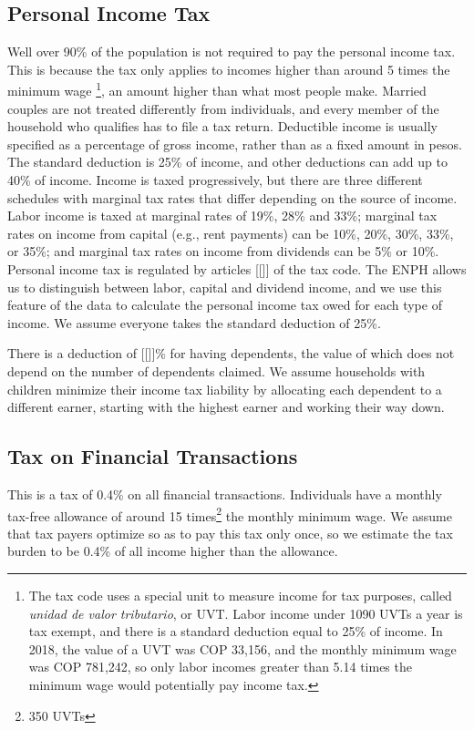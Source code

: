 \documentclass[12pt]{article}
\begin{document}
\begin{appendices}
\subsection{Personal Income Tax}
Well over 90\% of the population is not required to pay the personal income tax.
This is because the tax only applies to incomes
higher than around 5 times the minimum wage
\footnote{
The tax code uses a special unit to measure income for tax purposes,
called \textit{unidad de valor tributario}, or UVT.
Labor income under 1090 UVTs a year is tax exempt,
and there is a standard deduction equal to 25\% of income.
In 2018, the value of a UVT was COP 33,156,
and the monthly minimum wage was COP 781,242,
so only labor incomes greater than 5.14 times the minimum wage
would potentially pay income tax.},
an amount higher than what most people make.
Married couples are not treated differently from individuals,
and every member of the household who qualifies has to file a tax return.
Deductible income is usually specified as a percentage of gross income,
rather than as a fixed amount in pesos.
The standard deduction is 25\% of income,
and other deductions can add up to 40\% of income.
Income is taxed progressively,
but there are three different schedules
with marginal tax rates that differ depending on the source of income.
Labor income is taxed at marginal rates of 19\%, 28\% and 33\%;
marginal tax rates on income from capital
(e.g., rent payments)
can be 10\%, 20\%, 30\%, 33\%, or 35\%;
and marginal tax rates on income from dividends can be 5\% or 10\%.
Personal income tax is regulated by articles [[]] of the tax code.
The ENPH allows us to distinguish between
labor, capital and dividend income,
and we use this feature of the data to calculate
the personal income tax owed for each type of income.
We assume everyone takes the standard deduction of 25\%.

There is a deduction of [[]]\% for having dependents,
the value of which does not depend on the number of dependents claimed.
We assume households with children minimize their income tax liability
by allocating each dependent to a different earner,
starting with the highest earner and working their way down.

\subsection{Tax on Financial Transactions}

This is a tax of 0.4\% on all financial transactions.
Individuals have a monthly tax-free allowance of around
15 times\footnote{350 UVTs} the monthly minimum wage.
We assume that tax payers optimize so as to pay this tax only once,
so we estimate the tax burden to be
0.4\% of all income higher than the allowance.


\end{appendices}
\end{document}
